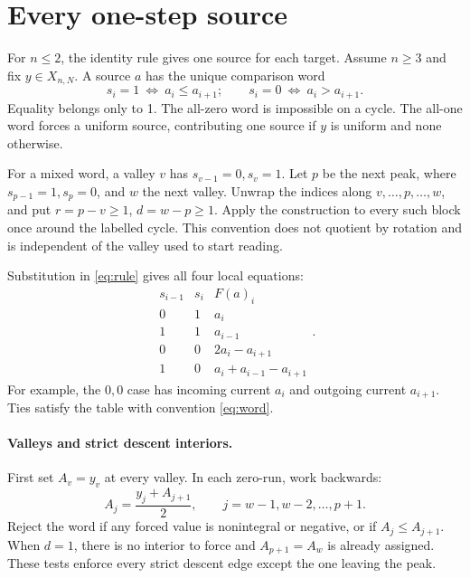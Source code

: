 \section{Every one-step source}\label{sec:inverse}
For $n\le2$, the identity rule gives one source for each target. Assume
$n\ge3$ and fix $y\in X_{n,N}$. A source $a$ has the unique comparison word
\begin{equation}\label{eq:word}
 s_i=1\ \Longleftrightarrow\ a_i\le a_{i+1};
 \qquad s_i=0\ \Longleftrightarrow\ a_i>a_{i+1}.
\end{equation}
Equality belongs only to 1. The all-zero word is impossible on a cycle.
The all-one word forces a uniform source, contributing one source if
$y$ is uniform and none otherwise.

For a mixed word, a valley $v$ has $s_{v-1}=0,s_v=1$.
Let $p$ be the next peak, where $s_{p-1}=1,s_p=0$, and $w$ the next
valley. Unwrap the indices along $v,\ldots,p,\ldots,w$, and put
$r=p-v\ge1$, $d=w-p\ge1$. Apply the construction to every such block
once around the labelled cycle. This convention does not quotient by
rotation and is independent of the valley used to start reading.

Substitution in \eqref{eq:rule} gives all four local equations:
\begin{equation}\label{eq:local-table}
\begin{array}{c|c|c}
s_{i-1}&s_i&F(a)_i\\ \hline
0&1&a_i\\
1&1&a_{i-1}\\
0&0&2a_i-a_{i+1}\\
1&0&a_i+a_{i-1}-a_{i+1}
\end{array}.
\end{equation}
For example, the $0,0$ case has incoming current $a_i$ and outgoing
current $a_{i+1}$. Ties satisfy the table with convention \eqref{eq:word}.

\paragraph{Valleys and strict descent interiors.}
First set $A_v=y_v$ at every valley. In each zero-run, work backwards:
\begin{equation}\label{eq:descent}
 A_j=\frac{y_j+A_{j+1}}2,\qquad j=w-1,w-2,\ldots,p+1.
\end{equation}
Reject the word if any forced value is nonintegral or negative, or if
$A_j\le A_{j+1}$. When $d=1$, there is no interior to force and
$A_{p+1}=A_w$ is already assigned. These tests enforce every strict
descent edge except the one leaving the peak.

